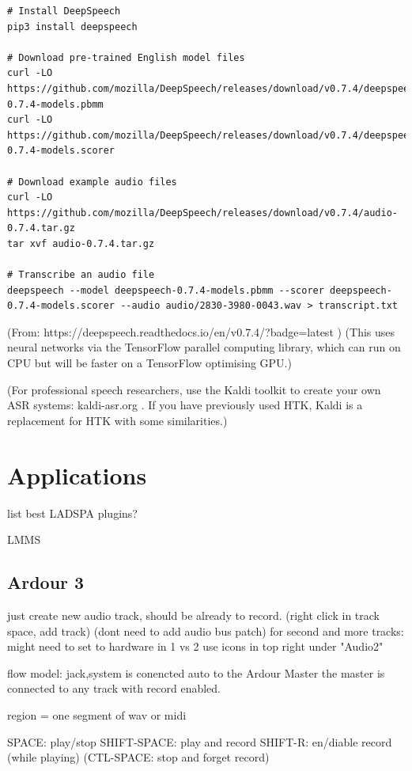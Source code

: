 \documentclass[oneside,english]{scrbook}
\begin{document}
\begin{verbatim}
# Install DeepSpeech
pip3 install deepspeech

# Download pre-trained English model files
curl -LO https://github.com/mozilla/DeepSpeech/releases/download/v0.7.4/deepspeech-0.7.4-models.pbmm
curl -LO https://github.com/mozilla/DeepSpeech/releases/download/v0.7.4/deepspeech-0.7.4-models.scorer

# Download example audio files
curl -LO https://github.com/mozilla/DeepSpeech/releases/download/v0.7.4/audio-0.7.4.tar.gz
tar xvf audio-0.7.4.tar.gz

# Transcribe an audio file
deepspeech --model deepspeech-0.7.4-models.pbmm --scorer deepspeech-0.7.4-models.scorer --audio audio/2830-3980-0043.wav > transcript.txt

\end{verbatim}

(From: https://deepspeech.readthedocs.io/en/v0.7.4/?badge=latest )  
(This uses neural networks via the TensorFlow parallel computing library, which can run on CPU but will be faster on a TensorFlow optimising GPU.)

(For professional speech researchers, use the Kaldi toolkit to create your own ASR systems: kaldi-asr.org . If you have previously used HTK, Kaldi is a replacement for HTK with some similarities.)


\chapter{Applications}

list best LADSPA plugins?

LMMS

\section{Ardour 3}

just create new audio track, should be already to record. 
	(right click in track space, add track)
	(dont need to add audio bus patch) 
	for second and more tracks:
		might need to set to hardware in 1 vs 2
			use icons in top right under "Audio2"

flow model:
	jack,system is conencted auto to the Ardour Master
	the master is connected to any track with record enabled.

region = one segment of wav or midi

SPACE: 		play/stop
SHIFT-SPACE:  	play and record  
SHIFT-R:  	en/diable record (while playing)
(CTL-SPACE: 	stop and forget record)
\end{document}
